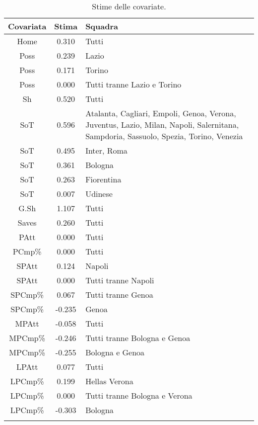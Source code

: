 \begin{table}[]%
	
	\renewcommand{\arraystretch}{1.7}
	\centering
	\begin{tabular}{ccp{10cm}}
		\hline	
		
		\textbf{Covariata} & \textbf{Stima} & \textbf{Squadra} \\	
		\hline
		Home & 0.310 & Tutti\\
		Poss & 0.239 & Lazio \\
		Poss & 0.171 & Torino\\
		Poss & 0.000 & Tutti tranne Lazio e Torino\\
		Sh & 0.520 & Tutti \\
		SoT & 0.596 & Atalanta, Cagliari, Empoli, Genoa, Verona, Juventus, Lazio, Milan, Napoli, Salernitana, Sampdoria, Sassuolo, Spezia, Torino, Venezia\\
		SoT & 0.495 & Inter, Roma \\
		SoT & 0.361 & Bologna \\
		SoT & 0.263 & Fiorentina\\
		SoT & 0.007 & Udinese \\
		G.Sh & 1.107 & Tutti \\
		Saves & 0.260 & Tutti \\
		PAtt & 0.000 & Tutti \\
		PCmp\% & 0.000 & Tutti \\
		SPAtt & 0.124 & Napoli \\
		SPAtt & 0.000 & Tutti tranne Napoli \\
		SPCmp\% & 0.067 & Tutti tranne Genoa \\ 
		SPCmp\% & -0.235 & Genoa \\	
		MPAtt & -0.058 & Tutti \\ 
		MPCmp\% & -0.246 & Tutti tranne Bologna e Genoa \\
		MPCmp\% & -0.255 & Bologna e Genoa \\
		LPAtt & 0.077 & Tutti \\
		LPCmp\% & 0.199 & Hellas Verona \\
		LPCmp\% & 0.000 & Tutti tranne Bologna e Verona \\
		LPCmp\% & -0.303 & Bologna \\	     		   		    
		\hline
		& &  \\
		
	\end{tabular} \hbox{}
	\caption{Stime delle covariate.} \label{tab:BTCL2} 
	
\end{table}
